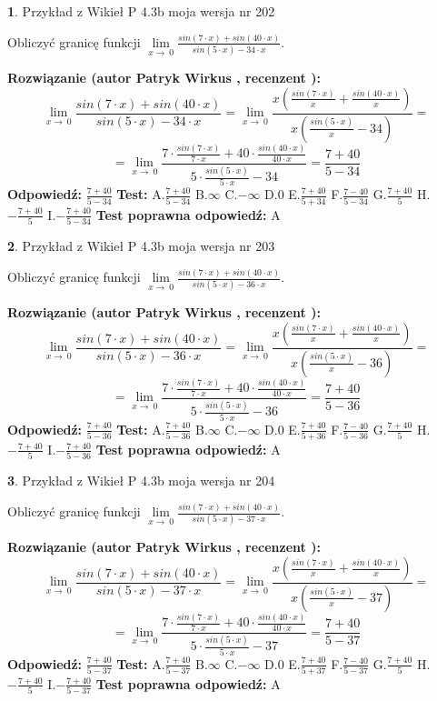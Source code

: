 \documentclass[12pt, a4paper]{article}
\theoremstyle{definition} %
\newtheorem{zad}{}
\newcommand{\zadStart}[1]{\begin{zad}#1\newline}
\newcommand{\zadStop}{\end{zad}}
\newcommand{\rozwStart}[2]{\noindent \textbf{Rozwiązanie (autor #1 , recenzent #2): }\newline}
\newcommand{\rozwStop}{\newline}
\newcommand{\odpStart}{\noindent \textbf{Odpowiedź:}\newline}
\newcommand{\odpStop}{\newline}
\newcommand{\testStart}{\noindent \textbf{Test:}\newline}
\newcommand{\testStop}{\newline}
\newcommand{\kluczStart}{\noindent \textbf{Test poprawna odpowiedź:}\newline}
\newcommand{\kluczStop}{\newline}
\begin{document}
\zadStart{Przykład z Wikieł P 4.3b moja wersja nr 202}


Obliczyć granicę funkcji $\lim\limits_{x\to\ 0}\frac{sin(7 \cdot x)+sin(40 \cdot x)}{sin(5 \cdot x)-34 \cdot x}$.
\zadStop
\rozwStart{Patryk Wirkus}{}
$$\lim\limits_{x\to\ 0}\frac{sin(7 \cdot x)+sin(40 \cdot x)}{sin(5 \cdot x)-34 \cdot x}=\lim\limits_{x\to\ 0}\frac{x(\frac{sin(7 \cdot x)}{x}+\frac{sin(40 \cdot x)}{x})}{x(\frac{sin(5 \cdot x)}{x}-34)}=$$
$$=\lim\limits_{x\to\ 0}\frac{7 \cdot \frac{sin(7 \cdot x)}{7 \cdot x}+40 \cdot \frac{sin(40 \cdot x)}{40 \cdot x}}{5 \cdot \frac{sin(5 \cdot x)}{5 \cdot x}-34}=\frac{7+40}{5-34}$$
\rozwStop
\odpStart
$\frac{7+40}{5-34}$
\odpStop
\testStart
A.$\frac{7+40}{5-34}$
B.$\infty$
C.$-\infty$
D.$0$
E.$\frac{7+40}{5+34}$
F.$\frac{7-40}{5-34}$
G.$\frac{7+40}{5}$
H.$-\frac{7+40}{5}$
I.$-\frac{7+40}{5-34}$
\testStop
\kluczStart
A
\kluczStop



\zadStart{Przykład z Wikieł P 4.3b moja wersja nr 203}


Obliczyć granicę funkcji $\lim\limits_{x\to\ 0}\frac{sin(7 \cdot x)+sin(40 \cdot x)}{sin(5 \cdot x)-36 \cdot x}$.
\zadStop
\rozwStart{Patryk Wirkus}{}
$$\lim\limits_{x\to\ 0}\frac{sin(7 \cdot x)+sin(40 \cdot x)}{sin(5 \cdot x)-36 \cdot x}=\lim\limits_{x\to\ 0}\frac{x(\frac{sin(7 \cdot x)}{x}+\frac{sin(40 \cdot x)}{x})}{x(\frac{sin(5 \cdot x)}{x}-36)}=$$
$$=\lim\limits_{x\to\ 0}\frac{7 \cdot \frac{sin(7 \cdot x)}{7 \cdot x}+40 \cdot \frac{sin(40 \cdot x)}{40 \cdot x}}{5 \cdot \frac{sin(5 \cdot x)}{5 \cdot x}-36}=\frac{7+40}{5-36}$$
\rozwStop
\odpStart
$\frac{7+40}{5-36}$
\odpStop
\testStart
A.$\frac{7+40}{5-36}$
B.$\infty$
C.$-\infty$
D.$0$
E.$\frac{7+40}{5+36}$
F.$\frac{7-40}{5-36}$
G.$\frac{7+40}{5}$
H.$-\frac{7+40}{5}$
I.$-\frac{7+40}{5-36}$
\testStop
\kluczStart
A
\kluczStop



\zadStart{Przykład z Wikieł P 4.3b moja wersja nr 204}


Obliczyć granicę funkcji $\lim\limits_{x\to\ 0}\frac{sin(7 \cdot x)+sin(40 \cdot x)}{sin(5 \cdot x)-37 \cdot x}$.
\zadStop
\rozwStart{Patryk Wirkus}{}
$$\lim\limits_{x\to\ 0}\frac{sin(7 \cdot x)+sin(40 \cdot x)}{sin(5 \cdot x)-37 \cdot x}=\lim\limits_{x\to\ 0}\frac{x(\frac{sin(7 \cdot x)}{x}+\frac{sin(40 \cdot x)}{x})}{x(\frac{sin(5 \cdot x)}{x}-37)}=$$
$$=\lim\limits_{x\to\ 0}\frac{7 \cdot \frac{sin(7 \cdot x)}{7 \cdot x}+40 \cdot \frac{sin(40 \cdot x)}{40 \cdot x}}{5 \cdot \frac{sin(5 \cdot x)}{5 \cdot x}-37}=\frac{7+40}{5-37}$$
\rozwStop
\odpStart
$\frac{7+40}{5-37}$
\odpStop
\testStart
A.$\frac{7+40}{5-37}$
B.$\infty$
C.$-\infty$
D.$0$
E.$\frac{7+40}{5+37}$
F.$\frac{7-40}{5-37}$
G.$\frac{7+40}{5}$
H.$-\frac{7+40}{5}$
I.$-\frac{7+40}{5-37}$
\testStop
\kluczStart
A
\kluczStop
\end{document}
